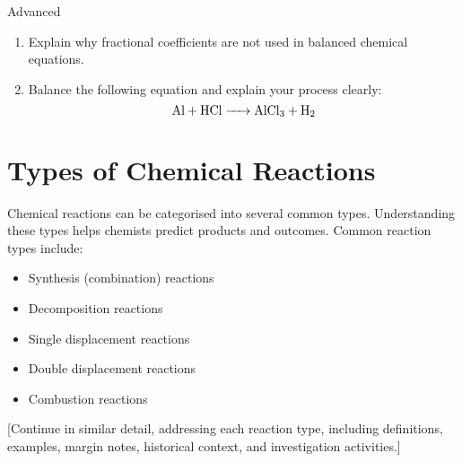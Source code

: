 \begin{tieredquestions}{Advanced}
\begin{enumerate}
    \item Explain why fractional coefficients are not used in balanced chemical equations.
    \item Balance the following equation and explain your process clearly:
    \[
    \ce{Al + HCl -> AlCl3 + H2}
    \]
\end{enumerate}
\end{tieredquestions}

\section{Types of Chemical Reactions}

Chemical reactions can be categorised into several common types. Understanding these types helps chemists predict products and outcomes. Common reaction types include:

\begin{itemize}
    \item Synthesis (combination) reactions
    \item Decomposition reactions
    \item Single displacement reactions
    \item Double displacement reactions
    \item Combustion reactions
\end{itemize}

\begin{marginfigure}
\centering
\caption{Summary of common reaction types.}
\label{fig:reaction_types}
\end{marginfigure}

[Continue in similar detail, addressing each reaction type, including definitions, examples, margin notes, historical context, and investigation activities.]

